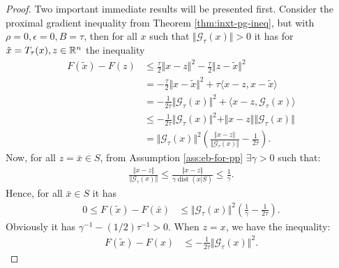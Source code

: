 \documentclass[12pt]{article}
\DeclareMathOperator{\dist}{\mathop{dist}}
\begin{document}
        \begin{proof}
            Two important immediate results will be presented first.
            Consider the proximal gradient inequality from Theorem \ref{thm:inxt-pg-ineq}, but with $\rho = 0, \epsilon = 0, B = \tau$, then for all $x$ such that $\Vert \mathcal G_\tau(x)\Vert > 0$ it has for $\tilde x = T_{\tau}(x), z \in \mathbb R^n$ the inequality 
            \begin{align*}
                F(\tilde x) - F(z) 
                &\le 
                \frac{\tau}{2}\Vert x - z\Vert^2 - \frac{\tau}{2}\Vert z - \tilde x\Vert^2
                \\
                &=  
                - \frac{\tau}{2}\Vert x - \tilde x\Vert^2
                + \tau\langle x - z, x - \tilde x\rangle
                \\
                &=  - \frac{1}{2\tau}\Vert \mathcal G_\tau(x) \Vert^2
                + \langle x - z, \mathcal G_\tau(x)\rangle
                \\
                &\le  - \frac{1}{2\tau}\Vert \mathcal G_\tau(x)\Vert^2 
                + \Vert x - z\Vert \Vert \mathcal G_\tau(x)\Vert
                \\
                &=
                \Vert \mathcal G_\tau(x)\Vert^2\left(
                    \frac{\Vert x - z \Vert}{\Vert \mathcal G_\tau(x)\Vert} - \frac{1}{2\tau}
                \right). 
            \end{align*}
            Now, for all $z = \bar x \in S$, from Assumption \ref{ass:eb-for-pp} $\exists \gamma > 0$ such that: 
            \begin{align*}
                \frac{\Vert x - z \Vert}{\Vert \mathcal G_\tau(x)\Vert}
                \le 
                \frac{\Vert x - z \Vert}{\gamma \dist(x | S)} \le \frac{1}{\gamma}. 
            \end{align*}
            Hence, for all $\bar x \in S$ it has 
            \begin{align}\label{ineq:lin-cnvg-ista-eb-pitem1}
                0\le F(\tilde x) - F(\bar x)&\le 
                \Vert \mathcal G_\tau(x)\Vert^2\left(
                    \frac{1}{\gamma} - \frac{1}{2\tau}
                \right). 
            \end{align}
            Obviously it has $\gamma^{-1} - (1/2)\tau^{-1} > 0$. 
            When $z = x$, we have the inequality: 
            \begin{align}\label{ineq:lin-cnvg-ista-eb-pitem2}
                F(\tilde x) - F(x) &\le - \frac{1}{2\tau}\Vert \mathcal G_\tau(x)\Vert^2. 

\end{align}
\end{proof}
\end{document}
